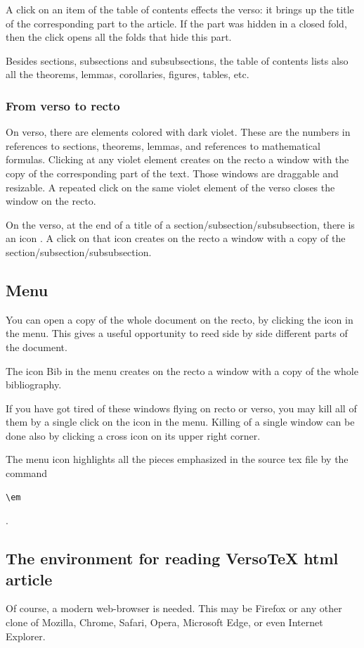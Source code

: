 \documentclass{article}
\begin{document}
A click on an item of the table of contents effects the verso: it 
brings up the title of the corresponding part to the article. If the part 
was hidden in a closed fold, then the click opens all the folds that 
hide this part. 

Besides sections, subsections and subsubsections, the table of contents
lists also all the theorems, lemmas, corollaries, figures, tables, etc.


\subsubsection{From verso to recto}\label{s1.3.2} On verso, there are 
elements colored with dark violet. These are the numbers in references 
to sections, theorems, lemmas, and references to mathematical formulas. 
Clicking at any violet element creates on the recto a window
 with the copy of the corresponding part of the text. 
Those windows are draggable and resizable. A repeated click on the same
violet element of the verso closes the window on the recto.

On the verso, at the end of a title of a section/subsection/subsubsection, 
there is an icon  . A click on that 
icon creates on the recto a window with a copy of the  
section/subsection/subsubsection. 

\subsection{Menu}\label{s1.4}
You can open a copy of the whole document on the recto, by clicking the
icon  in the menu. This gives a useful opportunity 
to reed side by side different parts of the document.

The icon Bib in the menu creates on the recto a window with a copy of the
whole bibliography.  

If you have got tired of these windows flying on recto or verso, you may 
kill all of them by a single click on the icon 
 in the menu. 
Killing of a single window can be done also by
clicking a cross icon  on its upper right corner.

The menu icon  highlights all the 
pieces emphasized in the source tex file by the command
\begin{verbatim}\em\end{verbatim}.


\subsection{The environment for reading VersoTeX html article}\label{s1.5}
Of course, a modern web-browser is needed. This may be Firefox or any 
other clone of Mozilla, Chrome, Safari, Opera, Microsoft Edge, or even 
Internet Explorer.
\end{document}
